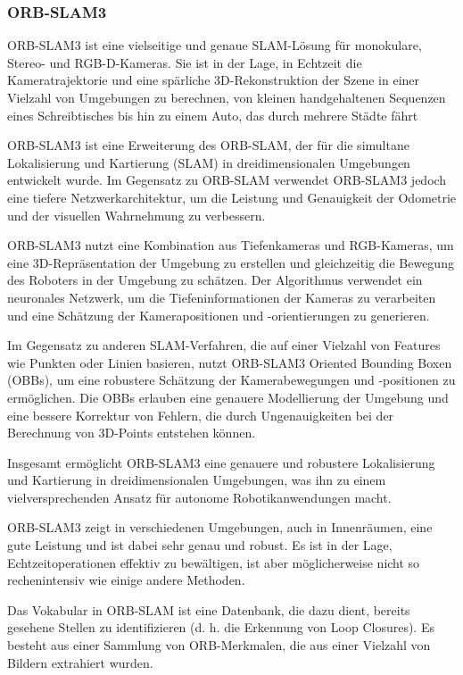 \cite{bescos2018dynaslam}
\subsubsection{ORB-SLAM3}

ORB-SLAM3 ist eine vielseitige und genaue \ac{SLAM}-Lösung für monokulare, Stereo- und \ac{RGB-D}-Kameras. Sie ist in der Lage, in Echtzeit die Kameratrajektorie und eine spärliche 3D-Rekonstruktion der Szene in einer Vielzahl von Umgebungen zu berechnen, von kleinen handgehaltenen Sequenzen eines Schreibtisches bis hin zu einem Auto, das durch mehrere Städte fährt

ORB-SLAM3 ist eine Erweiterung des ORB-SLAM, der für die simultane Lokalisierung und Kartierung (SLAM) in dreidimensionalen Umgebungen entwickelt wurde. Im Gegensatz zu ORB-SLAM verwendet ORB-SLAM3 jedoch eine tiefere Netzwerkarchitektur, um die Leistung und Genauigkeit der Odometrie und der visuellen Wahrnehmung zu verbessern.

ORB-SLAM3 nutzt eine Kombination aus Tiefenkameras und RGB-Kameras, um eine 3D-Repräsentation der Umgebung zu erstellen und gleichzeitig die Bewegung des Roboters in der Umgebung zu schätzen. Der Algorithmus verwendet ein neuronales Netzwerk, um die Tiefeninformationen der Kameras zu verarbeiten und eine Schätzung der Kamerapositionen und -orientierungen zu generieren.

Im Gegensatz zu anderen \ac{SLAM}-Verfahren, die auf einer Vielzahl von Features wie Punkten oder Linien basieren, nutzt ORB-SLAM3 Oriented Bounding Boxen (OBBs), um eine robustere Schätzung der Kamerabewegungen und -positionen zu ermöglichen. Die OBBs erlauben eine genauere Modellierung der Umgebung und eine bessere Korrektur von Fehlern, die durch Ungenauigkeiten bei der Berechnung von 3D-Points entstehen können.

Insgesamt ermöglicht ORB-SLAM3 eine genauere und robustere Lokalisierung und Kartierung in dreidimensionalen Umgebungen, was ihn zu einem vielversprechenden Ansatz für autonome Robotikanwendungen macht.

ORB-SLAM3 zeigt in verschiedenen Umgebungen, auch in Innenräumen, eine gute Leistung und ist dabei sehr genau und robust. Es ist in der Lage, Echtzeitoperationen effektiv zu bewältigen, ist aber möglicherweise nicht so rechenintensiv wie einige andere Methoden.

Das Vokabular in ORB-SLAM ist eine Datenbank, die dazu dient, bereits gesehene Stellen zu identifizieren (d. h. die Erkennung von Loop Closures). Es besteht aus einer Sammlung von ORB-Merkmalen, die aus einer Vielzahl von Bildern extrahiert wurden.

